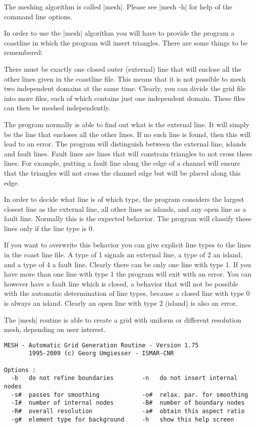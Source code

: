 The meshing algorithm is called |mesh|. Please see |mesh -h| for
help of the command line options. 

In order to use the |mesh| algorithm you will have to provide the program
a coastline in which the program will insert triangles. There are some
things to be remembered:

There must be exactly one closed outer (external) line that will enclose
all the other lines given in the coastline file. This means that it is
not possible to mesh two independent domains at the same time. Clearly,
you can divide the grid file into more files, each of which contains
just one independent domain. These files can then be meshed independently.

The program normally is able to find out what is the external line. It
will simply be the line that encloses all the other lines. If no such line
is found, then this will lead to an error. The program will distinguish
between the external line, islands and fault lines. Fault lines are lines
that will constrain triangles to not cross these lines. For example,
putting a fault line along the edge of a channel will ensure that the
triangles will not cross the channel edge but will be placed along
this edge.

In order to decide what line is of which type, the program considers the
largest closest line as the external line, all other lines as islands, and
any open line as a fault line. Normally this is the expected behavior. The
program will classify these lines only if the line type is 0.

If you want to overwrite this behavior you can give explicit line types to
the lines in the coast line file. A type of 1 signals an external line,
a type of 2 an island, and a type of 4 a fault line. Clearly there can
be only one line with type 1. If you have more than one line with type
1 the program will exit with an error. You can however have a fault line
which is closed, a behavior that will not be possible with the automatic
determination of line types, because a closed line with type 0 is always
an island. Clearly an open line with type 2 (island) is also an error.


The |mesh| routine is able to create a grid with uniform or  
different resolution mesh, depending on user interest.

\begin{verbatim}
MESH - Automatic Grid Generation Routine - Version 1.75 
       1995-2009 (c) Georg Umgiesser - ISMAR-CNR        

Options :
  -b   do not refine boundaries        -n   do not insert internal nodes
  -s#  passes for smoothing            -o#  relax. par. for smoothing   
  -I#  number of internal nodes        -B#  number of boundary nodes    
  -R#  overall resolution              -a#  obtain this aspect ratio    
  -g#  element type for background     -h   show this help screen  
\end{verbatim}


